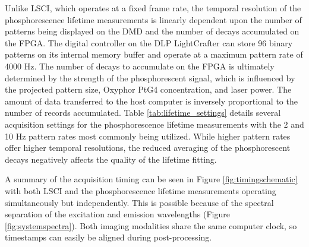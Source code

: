 \begin{table}
    \caption{Common acquisition settings for the phosphorescence lifetime measurements ($n$ = number of DMD patterns). Raw data is acquired by the FPGA at a rate of 160 MB/s.}
    \label{tab:lifetime_settings}
    \centering
\end{table}

Unlike LSCI, which operates at a fixed frame rate, the temporal resolution of the phosphorescence lifetime measurements is linearly dependent upon the number of patterns being displayed on the DMD and the number of decays accumulated on the FPGA. The digital controller on the DLP LightCrafter can store 96 binary patterns on its internal memory buffer and operate at a maximum pattern rate of 4000 Hz. The number of decays to accumulate on the FPGA is ultimately determined by the strength of the phosphorescent signal, which is influenced by the projected pattern size, Oxyphor PtG4 concentration, and laser power. The amount of data transferred to the host computer is inversely proportional to the number of records accumulated. Table \ref{tab:lifetime_settings} details several acquisition settings for the phosphorescence lifetime measurements with the 2 and 10 Hz pattern rates most commonly being utilized. While higher pattern rates offer higher temporal resolutions, the reduced averaging of the phosphorescent decays negatively affects the quality of the lifetime fitting.

A summary of the acquisition timing can be seen in Figure \ref{fig:timingschematic} with both LSCI and the phosphorescence lifetime measurements operating simultaneously but independently. This is possible because of the spectral separation of the excitation and emission wavelengths (Figure \ref{fig:systemspectra}). Both imaging modalities share the same computer clock, so timestamps can easily be aligned during post-processing.

